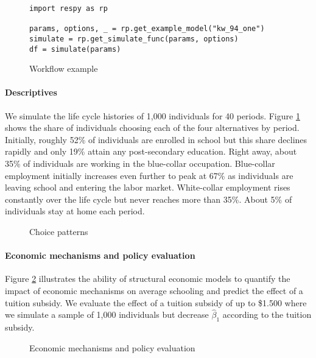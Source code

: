 \begin{figure}[ht!]\centering
\caption{Workflow example}
\begin{lstlisting}
import respy as rp

params, options, _ = rp.get_example_model("kw_94_one")
simulate = rp.get_simulate_func(params, options)
df = simulate(params)

\end{lstlisting}
\end{figure}

\paragraph{Descriptives} We simulate the life cycle histories of 1,000 individuals for 40 periods. Figure \ref{Descriptives} shows the share of individuals choosing each of the four alternatives by period. Initially, roughly 52\% of individuals are enrolled in school but this share declines rapidly and only 19\% attain any post-secondary education. Right away, about 35\% of individuals are working in the blue-collar occupation.  Blue-collar employment initially increases even further to peak at 67\% as individuals are leaving school and entering the labor market. White-collar employment rises constantly over the life cycle but never reaches more than 35\%. About 5\% of individuals stay at home each period.

\begin{figure}[ht!]\centering
\caption{Choice patterns}\label{Descriptives}
\end{figure}\FloatBarrier

\paragraph{Economic mechanisms and policy evaluation} Figure \ref{Economic mechanisms and policy evaluation} illustrates the ability of structural economic models to quantify the impact of economic mechanisms on average schooling and predict the effect of a tuition subsidy.  We evaluate the effect of a tuition subsidy of up to \$1.500 where we simulate a sample of 1,000 individuals but decrease $\hat{\beta}_1$ according to the tuition subsidy.

\begin{figure}[h!]\centering
\caption{Economic mechanisms and policy evaluation}\label{Economic mechanisms and policy evaluation}
\hspace{0.3cm}
\end{figure}
